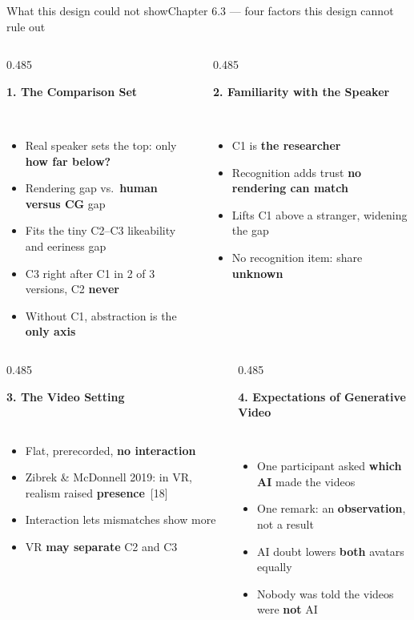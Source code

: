 \documentclass[aspectratio=169,10pt]{beamer}
\newcommand{\hl}[1]{{\color{knblue}\textbf{#1}}}
\newcommand{\bad}[1]{{\color{knred}\textbf{#1}}}
\newcommand{\panelhead}[1]{\noindent\colorbox{kncyan}{\parbox{0.96\textwidth}{\centering\vspace{1pt}\color{white}\scriptsize\bfseries #1\vspace{1pt}}}\\[0.25em]}
\newcommand{\panel}[1]{\noindent\colorbox{knlight}{\parbox{0.96\textwidth}{\vspace{2pt}\scriptsize
\begin{itemize}\setlength{\itemsep}{0.2em}\setlength{\leftmargini}{1.1em}#1\end{itemize}\vspace{2pt}}}}
\begin{document}
\begin{frame}{What this design could not show}{Chapter 6.3 — four factors this design cannot rule out}
  \vspace{0.1em}
  \begin{columns}[T,onlytextwidth]
    \begin{column}{0.485\textwidth}
      \panelhead{1. The Comparison Set}
      \panel{%
        \item Real speaker sets the top: only \hl{how far below?}
        \item Rendering gap vs.\ \hl{human versus CG} gap
        \item Fits the tiny C2--C3 likeability and eeriness gap
        \item C3 right after C1 in 2 of 3 versions, C2 \bad{never}
        \item Without C1, abstraction is the \hl{only axis}}
    \end{column}
    \begin{column}{0.485\textwidth}
      \panelhead{2. Familiarity with the Speaker}
      \panel{%
        \item C1 is \hl{the researcher}
        \item Recognition adds trust \bad{no rendering can match}
        \item Lifts C1 above a stranger, widening the gap
        \item No recognition item: share \bad{unknown}}
    \end{column}
  \end{columns}
  \par\vspace*{0.6em}
  \begin{columns}[T,onlytextwidth]
    \begin{column}{0.485\textwidth}
      \panelhead{3. The Video Setting}
      \panel{%
        \item Flat, prerecorded, \hl{no interaction}
        \item Zibrek \& McDonnell 2019: in VR, realism raised \hl{presence}~[18]
        \item Interaction lets mismatches show more
        \item VR \hl{may separate} C2 and C3}
    \end{column}
    \begin{column}{0.485\textwidth}
      \panelhead{4. Expectations of Generative Video}
      \panel{%
        \item One participant asked \hl{which AI} made the videos
        \item One remark: an \hl{observation}, not a result
        \item AI doubt lowers \bad{both} avatars equally
        \item Nobody was told the videos were \hl{not} AI}
    \end{column}
  \end{columns}
\end{frame}
\end{document}
